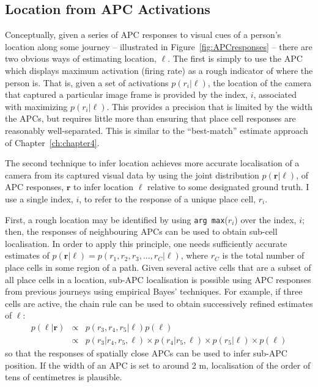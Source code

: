 \subsection{Location from APC Activations}
Conceptually, given a series of APC responses to visual cues of a person's location along some journey -- illustrated in Figure~\ref{fig:APCresponses} -- there are two obvious ways of estimating location, $\ell$.  The first is simply to use the APC which displays maximum activation (firing rate) as a rough indicator of where the person is. That is, given a set of activations $p(r_i|\ell)$, the location of the camera that captured a particular image frame is provided by the index, $i$, associated with maximizing $p(r_i|\ell)$. This provides a precision that is limited by the width the APCs, but requires little more than ensuring that place cell responses are reasonably well-separated. This is similar to the ``best-match'' estimate approach of Chapter~\ref{ch:chapter4}.

The second technique to infer location achieves more accurate localisation of a camera from its captured visual data by using the joint distribution $p(\mathbf{r}|\ell)$, of APC responses, $\mathbf{r}$ to infer location $\ell$ relative to some designated ground truth.  I use a single index, $i$, to refer to the response of a unique place cell, $r_i$.

 First, a rough location may be identified by using \texttt{arg max}($r_i$) over the index, $i$; then, the responses of neighbouring APCs can be used to obtain sub-cell localisation.  In order to apply this principle, one needs sufficiently accurate estimates of $p(\mathbf{r}|\ell) = p(r_1,r_2,r_3,...,r_C|\ell)$, where $r_C$ is the total number of place cells in some region of a path.   Given several active cells that are a subset of all place cells in a location, sub-APC localisation is possible using APC responses from previous journeys using empirical Bayes' techniques. For example, if three cells are active, the chain rule can be used to obtain successively refined estimates of $\ell$:
\begin{eqnarray}
p(\ell|\mathbf{r}) & \propto & p(r_3,r_4,r_5|\ell)p(\ell) \nonumber \\
&\propto& p(r_3|r_4,r_5,\ell)\times p(r_4|r_5,\ell)\times p(r_5|\ell)\times p(\ell)
\end{eqnarray}
 so that the responses of spatially close APCs can be used to infer sub-APC position.  If the width of an APC is set to around 2 m, localisation of the order of tens of centimetres is plausible. 


